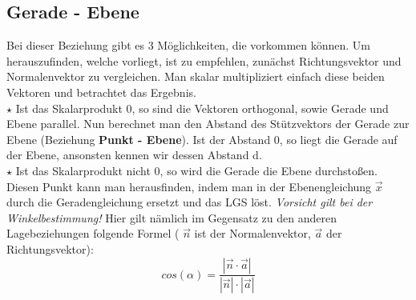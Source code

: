 \subsection{Gerade - Ebene}
	Bei dieser Beziehung gibt es 3 Möglichkeiten, die vorkommen können. Um
	herauszufinden, welche vorliegt, ist zu empfehlen, zunächst Richtungsvektor und
	Normalenvektor zu vergleichen. Man skalar multipliziert einfach diese beiden
	Vektoren und betrachtet das Ergebnis.\\

	\(\star\) Ist das Skalarprodukt 0, so sind die Vektoren orthogonal, sowie
	Gerade und Ebene parallel. Nun berechnet man den Abstand des Stützvektors der
	Gerade zur Ebene (Beziehung \textbf{Punkt - Ebene}). Ist der Abstand 0, so
	liegt die Gerade auf der Ebene, ansonsten kennen wir dessen Abstand d.\\

	\(\star\) Ist das Skalarprodukt nicht 0, so wird die Gerade die Ebene
	durchstoßen. Diesen Punkt kann man herausfinden, indem man in der
	Ebenengleichung \(\vec{x}\) durch die Geradengleichung ersetzt und das LGS
	löst.
	\emph{Vorsicht gilt bei der Winkelbestimmung!} Hier gilt nämlich im Gegensatz
	zu den anderen Lagebeziehungen folgende Formel ( \(\vec{n}\) ist der
	Normalenvektor, \(\vec{a}\) der Richtungsvektor):
	\[cos(\alpha)=\frac{|\vec{n}\cdot \vec{a}|}{|\vec{n}|\cdot |\vec{a}|}\]

